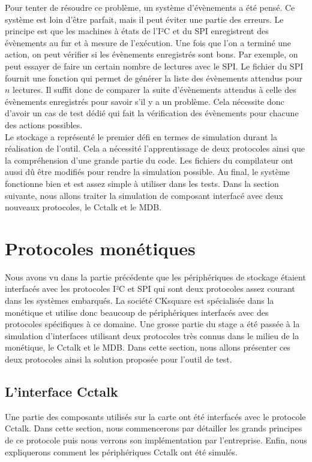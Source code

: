\documentclass[a4paper]{article}
\begin{document}
Pour tenter de résoudre ce problème, un système d'évènements a été pensé. Ce
système est loin d'être parfait, mais il peut éviter une partie des erreurs. Le
principe est que les machines à états de l'I²C et du SPI enregistrent des
évènements au fur et à mesure de l'exécution. Une fois que l'on a terminé une
action, on peut vérifier si les évènements enregistrés sont bons. Par exemple, on
peut essayer de faire un certain nombre de lectures avec le SPI. Le fichier du
SPI fournit une fonction qui permet de générer la liste des évènements attendus
pour $n$ lectures. Il suffit donc de comparer la suite d'évènements attendus à
celle des évènements enregistrés pour savoir s'il y a un problème. Cela
nécessite donc d'avoir un cas de test dédié qui fait la vérification des
évènements pour chacune des actions possibles.
\\
Le stockage a représenté le premier défi en termes de simulation durant la
réalisation de l'outil. Cela a nécessité l'apprentissage de deux protocoles
ainsi que la compréhension d'une grande partie du code. Les fichiers du
compilateur ont aussi dû être modifiés pour rendre la simulation possible. Au
final, le système fonctionne bien et est assez simple à utiliser dans les tests.
Dans la section suivante, nous allons traiter la simulation de composant
interfacé avec deux nouveaux protocoles, le Cctalk et le MDB.
\section{Protocoles monétiques}%

Nous avons vu dans la partie précédente que les périphériques de stockage
étaient interfacés avec les protocoles I²C et SPI qui sont deux protocoles assez
courant dans les systèmes embarqués. La société CKsquare est spécialisée dans la
monétique et utilise donc beaucoup de périphériques interfacés avec des
protocoles spécifiques à ce domaine. Une grosse partie du stage a été passée à
la simulation d'interfaces utilisant deux protocoles très connus dans le milieu
de la monétique, le Cctalk et le MDB. Dans cette section, nous allons présenter
ces deux protocoles ainsi la solution proposée pour l'outil de test.

\subsection{L'interface Cctalk}%
\label{interfacecctalk}

Une partie des composants utilisés sur la carte ont été interfacés avec le
protocole Cctalk. Dans cette section, nous commencerons par détailler les grands
principes de ce protocole puis nous verrons son implémentation par l'entreprise.
Enfin, nous expliquerons comment les périphériques Cctalk ont été simulés.
\end{document}
